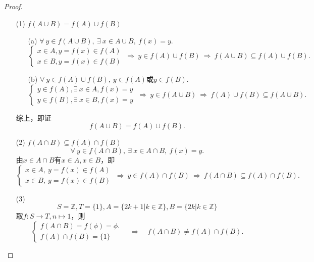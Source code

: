 \documentclass[UTF8]{ctexart}
\begin{document}
\subsection{}   %
\begin{proof}
    \begin{enumerate}
        \item []
        \item [(1)]$f(A\cup B) = f(A) \cup f(B)$
        \begin{enumerate}
            \item [(a)]$\forall\ y\in f(A\cup B),\ \exists\ x\in A\cup B,\ f(x)=y$.
            \[
                \begin{cases}
                    x\in A , y=f(x)\in f(A)\\
                    x\in B , y=f(x)\in f(B)
                \end{cases}  
                \ \Rightarrow \
                y\in f(A)\cup f(B)
                \ \Rightarrow \
                f(A\cup B) \subseteq f(A)\cup f(B).
            \]
            \item [(b)]$\forall\ y\in f(A)\cup f(B),\ y\in f(A)\mbox{或}y\in f(B)$.
            \[
                \begin{cases}
                    y\in f(A) , \exists\ x\in A, f(x) = y \\
                    y\in f(B) , \exists\ x\in B, f(x) = y
                \end{cases}  
                \ \Rightarrow \
                y\in f(A\cup B)
                \ \Rightarrow \
                f(A)\cup f(B) \subseteq f(A\cup B).
            \]
        \end{enumerate}
        综上，即证
        \[
            f(A\cup B) = f(A) \cup f(B).
        \]
        \item [(2)]$f(A\cap B) \subseteq f(A) \cap f(B)$
        \[
            \forall\ y\in f(A\cap B),\ \exists\ x\in A\cap B,\ f(x)=y.    
        \]
        由$x\in A\cap B$有$x\in A,x\in B$，即
        \[
            \begin{cases}
                x\in A,\ y=f(x)\in f(A)\\
                x\in B,\ y=f(x)\in f(B)
            \end{cases}    
            \ \Rightarrow \ 
            y\in f(A) \cap f(B)
            \ \Rightarrow \ 
            f(A\cap B) \subseteq f(A)\cap f(B).
        \]
        \item [(3)]
        \[
            S = \mathbb{Z}, T=\{1\}, 
            A=\{2k+1 | k\in \mathbb{Z}\}, B=\{2k | k\in \mathbb{Z}\}
        \]
        取$f:S\rightarrow T, n \mapsto 1$，则
        \[
            \begin{cases}
                f(A\cap B) = f(\phi) = \phi.\\
                f(A)\cap f(B) = \{1\}
            \end{cases}  
            \quad \Rightarrow\quad 
            f(A\cap B)\neq f(A) \cap f(B).  
        \]
    \end{enumerate}
\end{proof}
\end{document}
